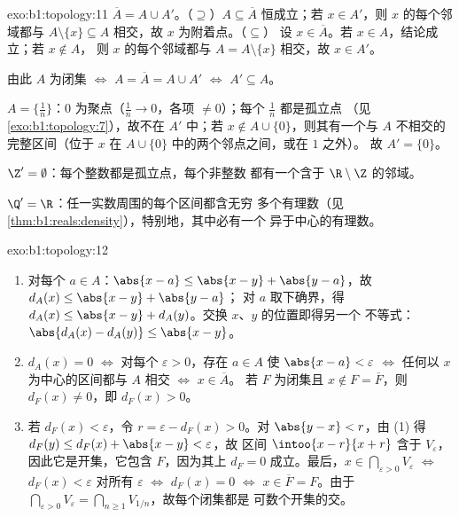 \begin{solution}{exo:b1:topology:11}
$\overline A = A \cup A'$。（$\supseteq$）$A \subseteq \overline
A$ 恒成立；若 $x \in A'$，则 $x$ 的每个邻域都与 $A
\setminus \{x\} \subseteq A$ 相交，故 $x$ 为附着点。（$\subseteq$）
设 $x \in \overline A$。若 $x \in A$，结论成立；若 $x \notin A$，
则 $x$ 的每个邻域都与 $A = A \setminus \{x\}$ 相交，故 $x \in
A'$。

由此 $A$ 为闭集 $\iff$ $A = \overline A = A \cup A'$
$\iff$ $A' \subseteq A$。

$A = \{\frac 1n\}$：$0$ 为聚点（$\frac 1n \to
0$，各项 $\neq 0$）；每个 $\frac 1n$ 都是孤立点
（见\cref{exo:b1:topology:7}），故不在 $A'$ 中；若 $x
\notin A \cup \{0\}$，则其有一个与 $A$ 不相交的完整区间（位于
$x$ 在 $A \cup \{0\}$ 中的两个邻点之间，或在 $1$ 之外）。
故 $A' = \{0\}$。

$\Z' = \emptyset$：每个整数都是孤立点，每个非整数
都有一个含于 $\R \setminus \Z$ 的邻域。

$\Q' = \R$：任一实数周围的每个区间都含无穷
多个有理数（见\cref{thm:b1:reals:density}），特别地，其中必有一个
异于中心的有理数。
\end{solution}

\begin{solution}{exo:b1:topology:12}
\begin{enumerate}
  \item 对每个 $a \in A$：$\abs{x - a} \leq \abs{x - y} +
        \abs{y - a}$，故 $d_A(x) \leq \abs{x - y} + \abs{y - a}$；
        对 $a$ 取下确界，得 $d_A(x) \leq \abs{x - y} +
        d_A(y)$。交换 $x$、$y$ 的位置即得另一个
        不等式：$\abs{d_A(x) - d_A(y)} \leq \abs{x - y}$。
  \item $d_A(x) = 0$ $\iff$ 对每个 $\varepsilon > 0$，存在
        $a \in A$ 使 $\abs{x - a} < \varepsilon$ $\iff$ 任何以
        $x$ 为中心的区间都与 $A$ 相交 $\iff$ $x \in \overline A$。
        若 $F$ 为闭集且 $x \notin F = \overline F$，则
        $d_F(x) \neq 0$，即 $d_F(x) > 0$。
  \item 若 $d_F(x) < \varepsilon$，令 $r = \varepsilon -
        d_F(x) > 0$。对 $\abs{y - x} < r$，由 (1) 得
        $d_F(y) \leq d_F(x) + \abs{x - y} < \varepsilon$，故
        区间 $\intoo{x - r}{x + r}$ 含于 $V_\varepsilon$，
        因此它是开集，它包含 $F$，因为其上 $d_F = 0$
        成立。最后，$x \in \bigcap_{\varepsilon>0}
        V_\varepsilon$ $\iff$ $d_F(x) < \varepsilon$ 对所有
        $\varepsilon$ $\iff$ $d_F(x) = 0$ $\iff$ $x \in \overline
        F = F$。由于 $\bigcap_{\varepsilon > 0} V_\varepsilon =
        \bigcap_{n \geq 1} V_{1/n}$，故每个闭集都是
        可数个开集的交。
\end{enumerate}
\end{solution}

